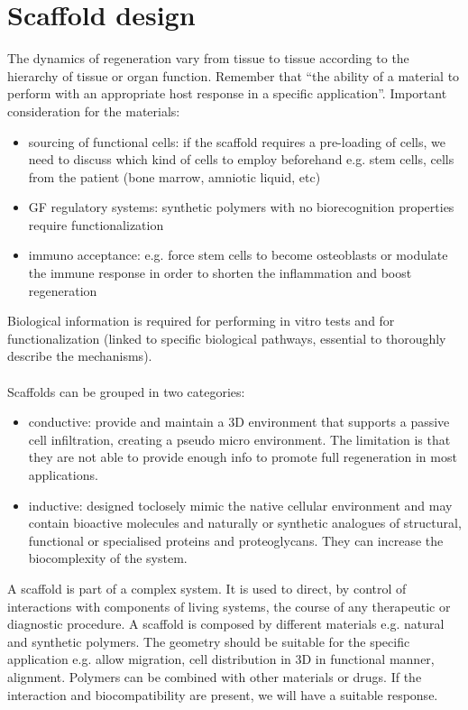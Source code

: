 \graphicspath{{chapters/08/images/}}
\chapter{Scaffold design}

The dynamics of regeneration vary from tissue to tissue according to the hierarchy of tissue or organ function.
Remember that “the ability of a material to perform with an appropriate host response in a specific application”.
Important consideration for the materials:
\begin{itemize}
\item sourcing of functional cells: if the scaffold requires a pre-loading of cells, we need to discuss which kind of cells to employ beforehand e.g. stem cells, cells from the patient (bone marrow, amniotic liquid, etc)
\item GF regulatory systems: synthetic polymers with no biorecognition properties require functionalization
\item immuno acceptance: e.g. force stem cells to become osteoblasts or modulate the immune response in order to shorten the inflammation and boost regeneration
\end{itemize}
\noindent
Biological information is required for performing in vitro tests and for functionalization (linked to specific biological pathways, essential to thoroughly describe the mechanisms).
\\
\\
\noindent
Scaffolds can be grouped in two categories:
\begin{itemize}
\item conductive: provide and maintain a 3D environment that supports a passive cell infiltration, creating a pseudo micro environment. The limitation is that they are not able to provide enough info to promote full regeneration in most applications.
\item  inductive: designed toclosely mimic the native cellular environment and may contain bioactive molecules and naturally or synthetic analogues of structural, functional or specialised proteins and proteoglycans. They can increase the biocomplexity of the system.
\end{itemize}
\noindent
A scaffold is part of a complex system. It is used to direct, by control of interactions with components of living systems, the course of any therapeutic or diagnostic procedure.
A scaffold is composed by different materials e.g. natural and synthetic polymers.
The geometry should be suitable for the specific application e.g. allow migration, cell distribution in 3D in functional manner, alignment.
Polymers can be combined with other materials or drugs.
If the interaction and biocompatibility are present, we will have a suitable response.

